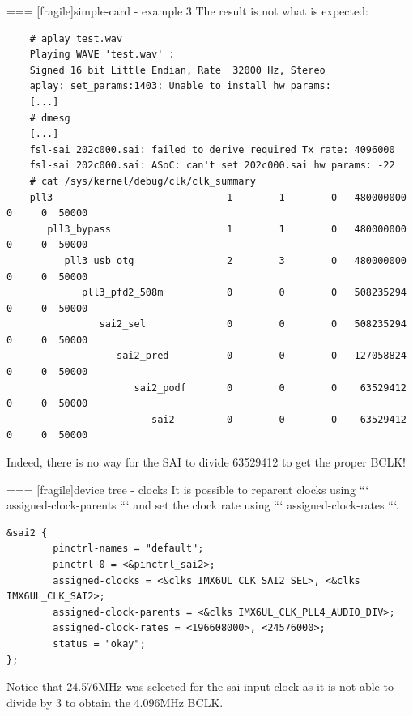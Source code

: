 === [fragile]{simple-card - example 3}
  The result is not what is expected:
  \begin{block}{}
    \fontsize{7}{6}\selectfont
    \begin{verbatim}
    # aplay test.wav
    Playing WAVE 'test.wav' :
    Signed 16 bit Little Endian, Rate  32000 Hz, Stereo
    aplay: set_params:1403: Unable to install hw params:
    [...]
    # dmesg
    [...]
    fsl-sai 202c000.sai: failed to derive required Tx rate: 4096000
    fsl-sai 202c000.sai: ASoC: can't set 202c000.sai hw params: -22
    # cat /sys/kernel/debug/clk/clk_summary
    pll3                              1        1        0   480000000          0     0  50000
       pll3_bypass                    1        1        0   480000000          0     0  50000
          pll3_usb_otg                2        3        0   480000000          0     0  50000
             pll3_pfd2_508m           0        0        0   508235294          0     0  50000
                sai2_sel              0        0        0   508235294          0     0  50000
                   sai2_pred          0        0        0   127058824          0     0  50000
                      sai2_podf       0        0        0    63529412          0     0  50000
                         sai2         0        0        0    63529412          0     0  50000
    \end{verbatim}
  \end{block}
  Indeed, there is no way for the SAI to divide 63529412 to get the
  proper BCLK!


=== [fragile]{device tree - clocks}
  It is possible to reparent clocks using
  ``` assigned-clock-parents ``` and set the clock rate using
  ``` assigned-clock-rates ```.
  \begin{block}{}
    \fontsize{7}{6}\selectfont
    \begin{verbatim}
&sai2 {
        pinctrl-names = "default";
        pinctrl-0 = <&pinctrl_sai2>;
        assigned-clocks = <&clks IMX6UL_CLK_SAI2_SEL>, <&clks IMX6UL_CLK_SAI2>;
        assigned-clock-parents = <&clks IMX6UL_CLK_PLL4_AUDIO_DIV>;
        assigned-clock-rates = <196608000>, <24576000>;
        status = "okay";
};
    \end{verbatim}
  \end{block}
  Notice that 24.576MHz was selected for the sai input clock as it is
  not able to divide by 3 to obtain the 4.096MHz BCLK.


